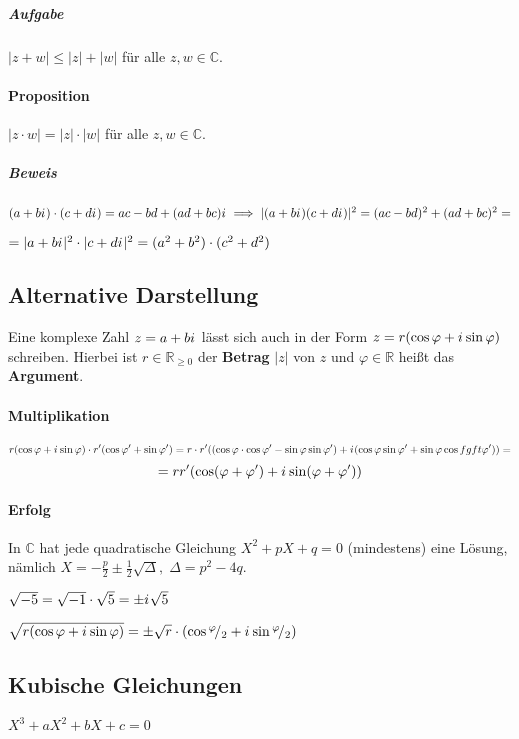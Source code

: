 \documentclass[14pt,a4paper]{article}
\newcommand*\rfrac[2]{{}^{#1}\!/_{#2}}
\newcommand{\R}{\ensuremath{\mathbb{R}}}
\newcommand{\C}{\ensuremath{\mathbb{C}}}
\newcommand{\iu}{{i\mkern1mu}}
\begin{document}
  \subparagraph{Aufgabe}
  $ | z + w | \leq |z| + |w| $ für alle $ z,w \in \C$.

  \paragraph{Proposition}
  $| z \cdot w | = |z| \cdot |w|$ für alle $z,w \in \C$.

  \subparagraph{Beweis}
  $(a+b\iu) \cdot (c+d\iu) = ac -bd + (ad + bc)\iu \implies |(a+b\iu)(c+d\iu)|^2
  = (ac-bd)^2 + (ad+bc)^2 =$

  $= |a + b\iu|^2 \cdot |c + d\iu|^2 = (a^2 + b^2) \cdot (c^2 + d^2)$

  \subsection{Alternative Darstellung}

  Eine komplexe Zahl $z = a + b \iu$ lässt sich auch in der Form $z = r (\cos
  \varphi + \iu \sin \varphi)$ schreiben.
  Hierbei ist $r \in \R_{\geq 0}$ der \textbf{Betrag} $|z|$ von $z$ und $\varphi \in \R$
  heißt das \textbf{Argument}.

  \paragraph{Multiplikation}
  $$ r(\cos \varphi + \iu \sin \varphi) \cdot r'(\cos \varphi ' + \sin \varphi ')
  = r \cdot r' ((\cos \varphi \cdot \cos \varphi' - \sin\varphi \sin \varphi')+
  \iu(\cos \varphi \sin \varphi'+ \sin\varphi\cos fg ft\varphi')) =$$
  $$ = r r' (\cos(\varphi + \varphi') + \iu \sin (\varphi + \varphi'))$$

  \paragraph{Erfolg}
  In $\C$ hat jede quadratische Gleichung $X^2 + pX + q = 0$ (mindestens) eine
  Lösung, nämlich $X = -\frac{p}{2} \pm \frac{1}{2} \sqrt{\Delta}, \; \Delta =
  p^2-4q$.

  $\sqrt{-5} = \sqrt{-1} \cdot \sqrt{5} = \pm \iu \sqrt{5}$

  $\sqrt{r(\cos \varphi + \iu \sin \varphi)} = \pm \sqrt{r} \cdot (\cos
  \rfrac{\varphi}{2} + \iu \sin \rfrac{\varphi}{2})$

  \subsection{Kubische Gleichungen}
  $ X^3 + aX^2 + bX + c = 0$
\end{document}
